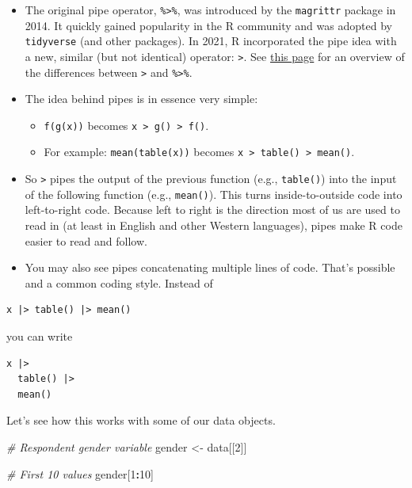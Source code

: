 \documentclass[
]{book}
\newenvironment{Shaded}{\begin{snugshade}}{\end{snugshade}}
\newcommand{\CommentTok}[1]{\textcolor[rgb]{0.56,0.35,0.01}{\textit{#1}}}
\newcommand{\DecValTok}[1]{\textcolor[rgb]{0.00,0.00,0.81}{#1}}
\newcommand{\NormalTok}[1]{#1}
\newcommand{\OtherTok}[1]{\textcolor[rgb]{0.56,0.35,0.01}{#1}}
\newcommand{\SpecialCharTok}[1]{\textcolor[rgb]{0.81,0.36,0.00}{\textbf{#1}}}
\providecommand{\tightlist}{%
  \setlength{\itemsep}{0pt}\setlength{\parskip}{0pt}}
\begin{document}
\begin{itemize}
\tightlist
\item
  The original pipe operator, \texttt{\%\textgreater{}\%}, was introduced by the \texttt{magrittr} package in 2014. It quickly gained popularity in the R community and was adopted by \texttt{tidyverse} (and other packages). In 2021, R incorporated the pipe idea with a new, similar (but not identical) operator: \texttt{\textbar{}\textgreater{}}. See \href{https://www.tidyverse.org/blog/2023/04/base-vs-magrittr-pipe/}{this page} for an overview of the differences between \texttt{\textbar{}\textgreater{}} and \texttt{\%\textgreater{}\%}.
\item
  The idea behind pipes is in essence very simple:

  \begin{itemize}
  \tightlist
  \item
    \texttt{f(g(x))} becomes \texttt{x\ \textbar{}\textgreater{}\ g()\ \textbar{}\textgreater{}\ f()}.
  \item
    For example: \texttt{mean(table(x))} becomes \texttt{x\ \textbar{}\textgreater{}\ table()\ \textbar{}\textgreater{}\ mean()}.
  \end{itemize}
\item
  So \texttt{\textbar{}\textgreater{}} pipes the output of the previous function (e.g., \texttt{table()}) into the input of the following function (e.g., \texttt{mean()}). This turns inside-to-outside code into left-to-right code. Because left to right is the direction most of us are used to read in (at least in English and other Western languages), pipes make R code easier to read and follow.
\item
  You may also see pipes concatenating multiple lines of code. That's possible and a common coding style. Instead of
\end{itemize}

\begin{verbatim}
x |> table() |> mean()
\end{verbatim}

you can write

\begin{verbatim}
x |>
  table() |>
  mean()
\end{verbatim}

Let's see how this works with some of our data objects.

\begin{Shaded}
\begin{Highlighting}[]
\CommentTok{\# Respondent gender variable }
\NormalTok{gender }\OtherTok{\textless{}{-}}\NormalTok{ data[[}\DecValTok{2}\NormalTok{]]}

\CommentTok{\# First 10 values}
\NormalTok{gender[}\DecValTok{1}\SpecialCharTok{:}\DecValTok{10}\NormalTok{]}
\end{Highlighting}
\end{Shaded}
\end{document}
